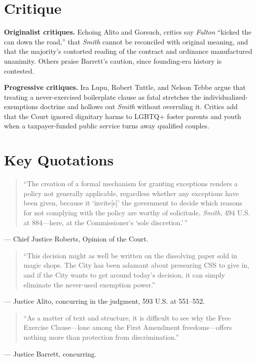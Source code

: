 \documentclass[12pt]{article}
\begin{document}
\section{Critique}

\textbf{Originalist critiques.} Echoing Alito and Gorsuch, critics say \textit{Fulton} ``kicked the can down the road,'' that \textit{Smith} cannot be reconciled with original meaning, and that the majority's contorted reading of the contract and ordinance manufactured unanimity. Others praise Barrett's caution, since founding-era history is contested.

\textbf{Progressive critiques.} Ira Lupu, Robert Tuttle, and Nelson Tebbe argue that treating a never-exercised boilerplate clause as fatal stretches the individualized-exemptions doctrine and hollows out \textit{Smith} without overruling it. Critics add that the Court ignored dignitary harms to LGBTQ+ foster parents and youth when a taxpayer-funded public service turns away qualified couples.

\section{Key Quotations}

\begin{quote}
``The creation of a formal mechanism for granting exceptions renders a policy not generally applicable, regardless whether any exceptions have been given, because it `invite[s]' the government to decide which reasons for not complying with the policy are worthy of solicitude, \textit{Smith}, 494 U.S. at 884---here, at the Commissioner's `sole discretion.'\,''
\end{quote}
\noindent --- Chief Justice Roberts, Opinion of the Court.

\begin{quote}
``This decision might as well be written on the dissolving paper sold in magic shops. The City has been adamant about pressuring CSS to give in, and if the City wants to get around today's decision, it can simply eliminate the never-used exemption power.''
\end{quote}
\noindent --- Justice Alito, concurring in the judgment, 593 U.S. at 551--552.

\begin{quote}
``As a matter of text and structure, it is difficult to see why the Free Exercise Clause---lone among the First Amendment freedoms---offers nothing more than protection from discrimination.''
\end{quote}
\noindent --- Justice Barrett, concurring.
\end{document}
